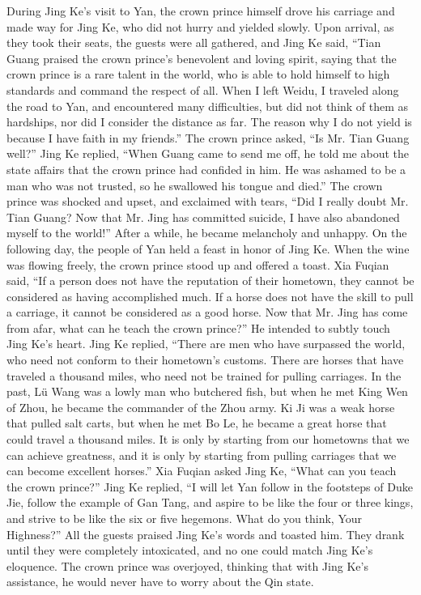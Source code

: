 \documentclass[12pt]{book}
\begin{document}
\begin{pairs}
\begin{Leftside}
\begin{fioesjfsoeifj}
During Jing Ke's visit to Yan, the crown prince himself drove his carriage and made way for Jing Ke, who did not hurry and yielded slowly. Upon arrival, as they took their seats, the guests were all gathered, and Jing Ke said, ``Tian Guang praised the crown prince's benevolent and loving spirit, saying that the crown prince is a rare talent in the world, who is able to hold himself to high standards and command the respect of all. When I left Weidu, I traveled along the road to Yan, and encountered many difficulties, but did not think of them as hardships, nor did I consider the distance as far. The reason why I do not yield is because I have faith in my friends.'' The crown prince asked, ``Is Mr. Tian Guang well?'' Jing Ke replied, ``When Guang came to send me off, he told me about the state affairs that the crown prince had confided in him. He was ashamed to be a man who was not trusted, so he swallowed his tongue and died.'' The crown prince was shocked and upset, and exclaimed with tears, ``Did I really doubt Mr. Tian Guang? Now that Mr. Jing has committed suicide, I have also abandoned myself to the world!'' After a while, he became melancholy and unhappy. On the following day, the people of Yan held a feast in honor of Jing Ke. When the wine was flowing freely, the crown prince stood up and offered a toast. Xia Fuqian said, ``If a person does not have the reputation of their hometown, they cannot be considered as having accomplished much. If a horse does not have the skill to pull a carriage, it cannot be considered as a good horse. Now that Mr. Jing has come from afar, what can he teach the crown prince?'' He intended to subtly touch Jing Ke's heart. Jing Ke replied, ``There are men who have surpassed the world, who need not conform to their hometown's customs. There are horses that have traveled a thousand miles, who need not be trained for pulling carriages. In the past, Lü Wang was a lowly man who butchered fish, but when he met King Wen of Zhou, he became the commander of the Zhou army. Ki Ji was a weak horse that pulled salt carts, but when he met Bo Le, he became a great horse that could travel a thousand miles. It is only by starting from our hometowns that we can achieve greatness, and it is only by starting from pulling carriages that we can become excellent horses.'' Xia Fuqian asked Jing Ke, ``What can you teach the crown prince?'' Jing Ke replied, ``I will let Yan follow in the footsteps of Duke Jie, follow the example of Gan Tang, and aspire to be like the four or three kings, and strive to be like the six or five hegemons. What do you think, Your Highness?'' All the guests praised Jing Ke's words and toasted him. They drank until they were completely intoxicated, and no one could match Jing Ke's eloquence. The crown prince was overjoyed, thinking that with Jing Ke's assistance, he would never have to worry about the Qin state.
\pend
\endnumbering
\end{fioesjfsoeifj}
\end{Leftside}
\end{pairs}
\end{document}
